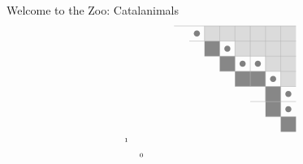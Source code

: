 \documentclass{beamer}
\newcommand{\mymidgray}{black!47}  %
\newcounter{c}
\begin{document}
\begin{frame}{Welcome to the Zoo: Catalanimals}
\[\begin{array}{@{\hspace{0.2mm}}c@{\quad\quad}cr}
\begin{tikzpicture}[scale = .47]
\begin{scope}
\node (vv) at (19/2,-19/2) {\tiny $1 $};
\node at (21/2,-21/2) {\tiny $0 $};
\end{scope}
\end{tikzpicture}
&  
\raisebox{9mm}{
\begin{tikzpicture}[scale=.47]
\begin{scope}
\draw[draw = none, fill = black!14] (3,-1) rectangle (4,-2);
 \draw[draw = none, fill = black!14] (4,-1) rectangle (5,-2);
 \draw[draw = none, fill = black!14] (5,-1) rectangle (6,-2);
 \draw[draw = none, fill = black!14] (5,-2) rectangle (6,-3);
 \draw[draw = none, fill = black!14] (6,-1) rectangle (7,-2);
 \draw[draw = none, fill = black!14] (6,-2) rectangle (7,-3);
 \draw[draw = none, fill = black!14] (7,-1) rectangle (8,-2);
 \draw[draw = none, fill = black!14] (7,-2) rectangle (8,-3);
 \draw[draw = none, fill = black!14] (7,-3) rectangle (8,-4);
 \draw[draw = none, fill = black!14] (8,-1) rectangle (9,-2);
 \draw[draw = none, fill = black!14] (8,-2) rectangle (9,-3);
 \draw[draw = none, fill = black!14] (8,-3) rectangle (9,-4);
 \draw[draw = none, fill = black!14] (8,-4) rectangle (9,-5);
 \draw[draw = none, fill = gray!100] (2+0.5, -1-0.5) circle (.2);
\draw[draw = none, fill = gray!100] (4+0.5, -2-0.5) circle (.2);
\draw[draw = none, fill = gray!100] (5+0.5, -3-0.5) circle (.2);
\draw[draw = none, fill = gray!100] (6+0.5, -3-0.5) circle (.2);
\draw[draw = none, fill = gray!100] (7+0.5, -4-0.5) circle (.2);
\draw[draw = none, fill = gray!100] (8+0.5, -5-0.5) circle (.2);
\draw[draw = none, fill = gray!100] (8+0.5, -6-0.5) circle (.2);
\draw[draw = none, fill = \mymidgray] (3,-2) rectangle (4,-3);
 \draw[draw = none, fill = \mymidgray] (4,-3) rectangle (5,-4);
 \draw[draw = none, fill = \mymidgray] (5,-4) rectangle (6,-5);
 \draw[draw = none, fill = \mymidgray] (6,-4) rectangle (7,-5);
 \draw[draw = none, fill = \mymidgray] (7,-5) rectangle (8,-6);
 \draw[draw = none, fill = \mymidgray] (7,-6) rectangle (8,-7);
 \draw[draw = none, fill = \mymidgray] (8,-7) rectangle (9,-8);
 \draw[thin, black!31] (1,-1) -- (9,-1);
\draw[thin, black!31] (2,-1) -- (2,-1);
\draw[thin, black!31] (2,-2) -- (9,-2);
\draw[thin, black!31] (3,-2) -- (3,-1);
\draw[thin, black!31] (3,-3) -- (9,-3);
\draw[thin, black!31] (4,-3) -- (4,-1);
\draw[thin, black!31] (4,-4) -- (9,-4);
\draw[thin, black!31] (5,-4) -- (5,-1);
\draw[thin, black!31] (5,-5) -- (9,-5);
\draw[thin, black!31] (6,-5) -- (6,-1);
\draw[thin, black!31] (6,-6) -- (9,-6);
\draw[thin, black!31] (7,-6) -- (7,-1);
\draw[thin, black!31] (7,-7) -- (9,-7);
\draw[thin, black!31] (8,-7) -- (8,-1);

\end{scope}
\end{tikzpicture}}
\end{array}\]
\end{frame}
\end{document}
